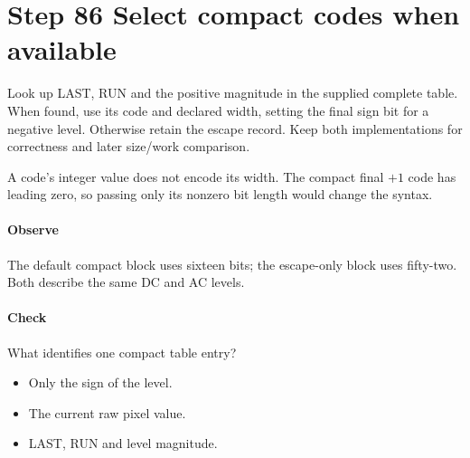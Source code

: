\section{Step 86 Select compact codes when available}\label{h263-coeff-s06}
Look up LAST, RUN and the positive magnitude in the supplied complete table.
When found, use its code and declared width, setting the final sign bit for a
negative level. Otherwise retain the escape record. Keep both implementations
for correctness and later size/work comparison.

A code's integer value does not encode its width. The compact final $+1$ code
has leading zero, so passing only its nonzero bit length would change the syntax.

\paragraph{Observe} The default compact block uses sixteen bits; the escape-only
block uses fifty-two. Both describe the same DC and AC levels.
\paragraph{Check} What identifies one compact table entry?
\begin{itemize}
  \item[A.] Only the sign of the level.
  \item[B.] The current raw pixel value.
  \item[C.] LAST, RUN and level magnitude.
\end{itemize}
